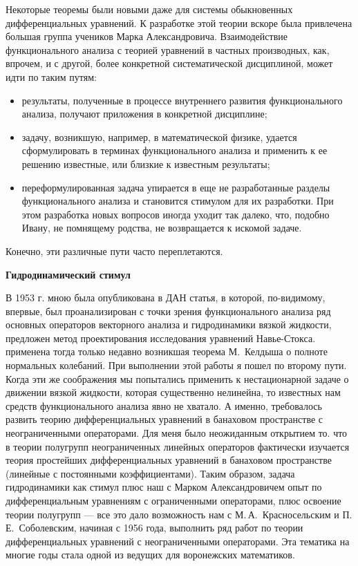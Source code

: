 Некоторые теоремы были новыми даже для системы
\linebreak
обы\-к\-но\-вен\-ных дифференциальных уравнений.
К разработке этой теории вскоре была привлечена большая группа учеников Марка Александровича. Взаимодействие функционального анализа с теорией уравнений в частных производных, как, впрочем, и с другой, более конкретной систематической дисциплиной, может идти по таким путям:
\begin{itemize}
	\item
		результаты,   полученные   в процессе внутреннего развития функционального анализа, получают приложения в конкретной дисциплине;
	\item
		задачу, возникшую, например, в математической физике, удается
	 сформулировать в терминах функционального анализа и применить к ее решению известные, или близкие к известным результаты;
	\item
		переформулированная задача упирается в еще не разработанные разделы функционального анализа и становится стимулом для их разработки. При этом разработка новых вопросов иногда уходит так далеко, что, подобно Ивану, не помнящему родства, не возвращается к искомой задаче.
\end{itemize}
Конечно, эти различные пути часто переплетаются.

{\bf Гидродинамический стимул}

В 1953 г. мною была опубликована в ДАН статья, в которой, по-видимому, впервые, был проанализирован с точки зрения функционального анализа ряд основных операторов векторного анализа и гидродинамики вязкой жидкости, предложен метод проектирования исследования уравнений Навье-Стокса. применена тогда только недавно возникшая теорема М.~Келдыша о полноте нормальных колебаний. При выполнении этой работы я пошел по второму пути. Когда эти же соображения мы попытались применить к нестационарной задаче о движении вязкой жидкости, которая существенно нелинейна, то известных нам средств функционального анализа явно не хватало. А именно, требовалось развить теорию дифференциальных уравнений в банаховом пространстве с неограниченными операторами. Для меня было неожиданным открытием то. что в теории полугрупп неограниченных линейных операторов фактически изучается теория простейших дифференциальных уравнений в банаховом пространстве (линейные с постоянными коэффициентами). Таким образом, задача гидродинамики как стимул плюс наш с Марком Александровичем опыт по дифференциальным уравнениям с ограниченными операторами, плюс освоение теории полугрупп — все это дало возможность нам с М.\,А.~Красносельским и П.\,Е.~Соболевским, начиная с 1956 года, выполнить ряд работ по теории дифференциальных уравнений с неограниченными операторами. Эта тематика на многие годы стала одной из ведущих для воронежских математиков.

